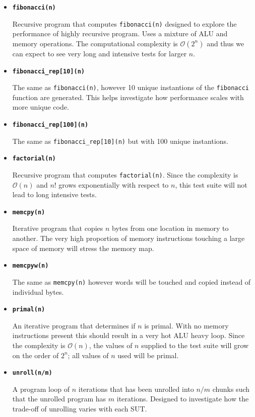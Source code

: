 \begin{itemize}
    \item \textbf{\texttt{fibonacci(n)}}
    
    Recursive program that computes \texttt{fibonacci(n)} designed to explore the performance of highly recursive program. Uses a mixture of ALU and memory operations. The computational complexity is $\mathcal{O}(2^n)$ and thus we can expect to see very long and intensive tests for larger $n$.
    
    \item \textbf{\texttt{fibonacci\_rep[10](n)}}
    
    The same as \texttt{fibonacci(n)}, however 10 unique instantions of the \texttt{fibonacci} function are generated. This helps investigate how performance scales with more unique code.
    
    \item \textbf{\texttt{fibonacci\_rep[100](n)}}
    
    The same as \texttt{fibonacci\_rep[10](n)} but with 100 unique instantions.
    
    \item \textbf{\texttt{factorial(n)}}
    
    Recursive program that computes \texttt{factorial(n)}. Since the complexity is $\mathcal{O}(n)$ and $n!$ grows exponentially with respect to $n$, this test suite will not lead to long intensive tests.

    \item \textbf{\texttt{memcpy(n)}}
    
    Iterative program that copies $n$ bytes from one location in memory to another. The very high proportion of memory instructions touching a large space of memory will stress the memory map.
    
    \item \textbf{\texttt{memcpyw(n)}}
    
    The same as \texttt{memcpy(n)} however words will be touched and copied instead of individual bytes.
    
    \item \textbf{\texttt{primal(n)}}
    
    An iterative program that determines if $n$ is primal. With no memory instructions present this should result in a very hot ALU heavy loop. Since the complexity is $\mathcal{O}(n)$, the values of $n$ supplied to the test suite will grow on the order of $2^n$; all values of $n$ used will be primal.
    
    \item \textbf{\texttt{unroll(n/m)}}
    
    A program loop of $n$ iterations that has been unrolled into $n/m$ chunks such that the unrolled program has $m$ iterations. Designed to investigate how the trade-off of unrolling varies with each SUT.
\end{itemize}

